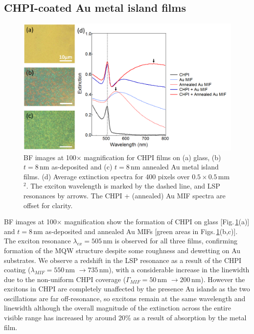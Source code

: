 \subsection{CHPI-coated Au metal island films}
\begin{figure}[h!] 
\centering    
\includegraphics[width=\textwidth]{Fig3}
\caption{BF images at 100$\times$ magnification for CHPI films on (a) glass, (b) $t=8$\,nm as-deposited and (c) $t=8$\,nm annealed Au metal island films. (d) Average extinction spectra for 400 pixels over $0.5\times0.5$\,mm$^2$. The exciton wavelength is marked by the dashed line, and LSP resonances by arrows. The CHPI + (annealed) Au MIF spectra are offset for clarity.}
\label{6Fig3}
\end{figure}
BF images at 100$\times$ magnification show the formation of CHPI on glass [Fig.\,\ref{6Fig3}(a)] and $t=8$\,nm as-deposited and annealed Au MIFs [green areas in Figs.\,\ref{6Fig3}(b,c)]. The exciton resonance $\lambda_{ex} = 505$\,nm is observed for all three films, confirming formation of the MQW structure despite some roughness and dewetting on Au substrates. We observe a redshift in the LSP resonance as a result of the CHPI coating ($\lambda_{MIF} = 550$\,nm $\rightarrow 735$\,nm), with a considerable increase in the linewidth due to the non-uniform CHPI coverage ($\Gamma_{MIF} = 50$\,nm $\rightarrow 200$\,nm). However the excitons in CHPI are completely unaffected by the presence Au islands as the two oscillations are far off-resonance, so excitons remain at the same wavelength and linewidth although the overall magnitude of the extinction across the entire visible range has increased by around 20\% as a result of absorption by the metal film.

